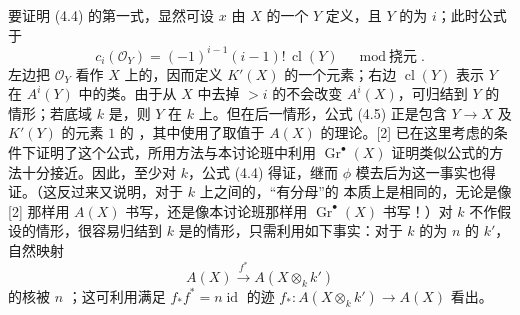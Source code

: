 要证明 (4.4) 的第一式，显然可设 $x$ 由 $X$ 的一个 $Y$ 定义，且 $Y$ 的为 $i$；此时公式于
\[c_i(\mathscr O_Y)=(-1)^{i-1}(i-1)!\,\operatorname{cl}(Y)
\quad\bmod\text{挠元}.\tag{4.5}\]
左边把 $\mathscr O_Y$ 看作 $X$ 上的，因而定义 $K'(X)$ 的一个元素；右边 $\operatorname{cl}(Y)$ 表示 $Y$ 在 $A^i(Y)$ 中的类。由于从 $X$ 中去掉 $>i$ 的不会改变 $A^i(X)$，可归结到 $Y$ 的情形；若底域 $k$ 是，则 $Y$ 在 $k$ 上。但在后一情形，公式 (4.5) 正是包含 $Y\to X$ 及 $K'(Y)$ 的元素 $1$ 的 ，其中使用了取值于  $A(X)$ 的理论。[2] 已在这里考虑的条件下证明了这个公式，所用方法与本讨论班中利用 $\operatorname{Gr}^\bullet(X)$ 证明类似公式的方法十分接近。因此，至少对 $k$，公式 (4.4) 得证，继而 $\phi$ 模去后为这一事实也得证。（这反过来又说明，对于 $k$ 上之间的，“有分母”的 本质上是相同的，无论是像 [2] 那样用 $A(X)$ 书写，还是像本讨论班那样用 $\operatorname{Gr}^\bullet(X)$ 书写！）对 $k$ 不作假设的情形，很容易归结到 $k$ 是的情形，只需利用如下事实：对于 $k$ 的为 $n$ 的 $k'$，自然映射
\[A(X)\xrightarrow{f^*}A(X\otimes_k k')\]
的核被 $n$ ；这可利用满足 $f_*f^*=n\operatorname{id}$ 的迹 $f_*:A(X\otimes_k k')\to A(X)$ 看出。

